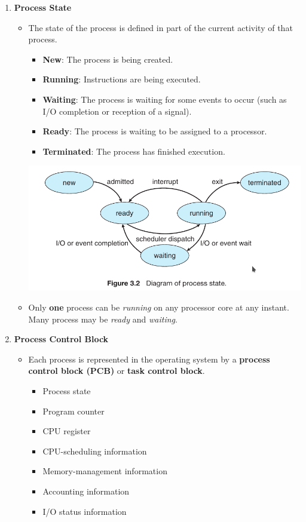 \documentclass[10pt]{article}
\begin{document}
\begin{enumerate}
	\item \textbf{Process State}
	\begin{itemize}
		\item The state of the process is defined in part of the current activity of that process.
		\begin{itemize}
			\item \textbf{New}: The process is being created.
			\item \textbf{Running}: Instructions are being executed.
			\item \textbf{Waiting}: The process is waiting for some events to occur (such as I/O completion or reception of a signal).
			\item \textbf{Ready}: The process is waiting to be assigned to a processor.
			\item \textbf{Terminated}: The process has finished execution.
		\end{itemize}

		\includegraphics[scale=0.6]{Process_state.png}
		\\
		\bigbreak

		\item Only \textbf{one} process can be \textit{running} on any processor core at any instant. Many process may be \textit{ready} and \textit{waiting}. 
	\end{itemize}

	\item \textbf{Process Control Block}
	\begin{itemize}
		\item Each process is represented in the operating system by a \textbf{process control block (PCB)} or \textbf{task control block}.
		\begin{itemize}
			\item Process state
			\item Program counter
			\item CPU register
			\item CPU-scheduling information
			\item Memory-management information
			\item Accounting information
			\item I/O status information
		\end{itemize}
	\end{itemize}


\end{enumerate}
\end{document}
